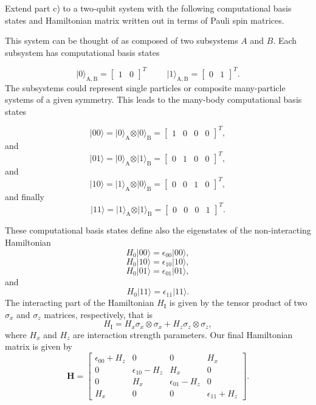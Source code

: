 \documentclass[%
oneside,                 %
final,                   %
10pt]{article}
\begin{document}
Extend part c) to a two-qubit system with the following computational
basis states and Hamiltonian matrix written out in terms of Pauli spin
matrices.

This system can be thought of as composed of two subsystems
$A$ and $B$. Each subsystem has computational basis states

\[
\vert 0\rangle_{\mathrm{A,B}}=\begin{bmatrix} 1 & 0\end{bmatrix}^T \hspace{1cm} \vert 1\rangle_{\mathrm{A,B}}=\begin{bmatrix} 0 & 1\end{bmatrix}^T.
\]
The subsystems could represent single particles or composite many-particle systems of a given symmetry.
This leads to the many-body computational basis states

\[
\vert 00\rangle = \vert 0\rangle_{\mathrm{A}}\otimes \vert 0\rangle_{\mathrm{B}}=\begin{bmatrix} 1 & 0 & 0 &0\end{bmatrix}^T,
\]
and
\[
\vert 01\rangle = \vert 0\rangle_{\mathrm{A}}\otimes \vert 1\rangle_{\mathrm{B}}=\begin{bmatrix} 0 & 1 & 0 &0\end{bmatrix}^T,
\]
and
\[
\vert 10\rangle = \vert 1\rangle_{\mathrm{A}}\otimes \vert 0\rangle_{\mathrm{B}}=\begin{bmatrix} 0 & 0 & 1 &0\end{bmatrix}^T,
\]
and finally
\[
\vert 11\rangle = \vert 1\rangle_{\mathrm{A}}\otimes \vert 1\rangle_{\mathrm{B}}=\begin{bmatrix} 0 & 0 & 0 &1\end{bmatrix}^T.
\]

These computational basis states define also the eigenstates of the non-interacting  Hamiltonian
\[
H_0\vert 00 \rangle = \epsilon_{00}\vert 00 \rangle,
\]
\[
H_0\vert 10 \rangle = \epsilon_{10}\vert 10 \rangle,
\]
\[
H_0\vert 01 \rangle = \epsilon_{01}\vert 01 \rangle,
\]
and
\[
H_0\vert 11 \rangle = \epsilon_{11}\vert 11 \rangle.
\]
The interacting part of the Hamiltonian $H_{\mathrm{I}}$ is given by the tensor product of two $\sigma_x$ and $\sigma_z$  matrices, respectively, that is
\[
H_{\mathrm{I}}=H_x\sigma_x\otimes\sigma_x+H_z\sigma_z\otimes\sigma_z,
\]
where $H_x$ and $H_z$ are interaction strength parameters. Our final Hamiltonian matrix is given by
\[
\bm{H}=\begin{bmatrix} \epsilon_{00}+H_z & 0 & 0 & H_x \\
                       0  & \epsilon_{10}-H_z & H_x & 0 \\
		       0 & H_x & \epsilon_{01}-H_z & 0 \\
		       H_x & 0 & 0 & \epsilon_{11} +H_z \end{bmatrix}.
\] 
\end{document}
